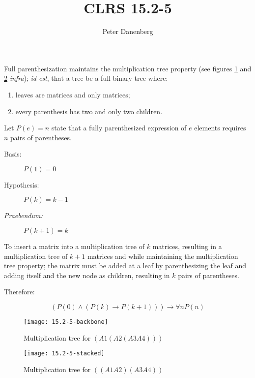 \documentclass{article}
\title{CLRS 15.2-5}
\author{Peter Danenberg}
\begin{document}
\maketitle

Full parenthesization maintains the multiplication tree property (see
figures \ref{fig:backbone} and \ref{fig:stacked} \emph{infra});
\emph{id est}, that a tree be a full binary tree where:

\begin{enumerate}
\item leaves are matrices and only matrices;
\item every parenthesis has two and only two children.
\end{enumerate}

Let $P(e) = n$ state that a fully parenthesized expression of $e$
elements requires $n$ pairs of parentheses.

\begin{description}
  \item[Basis:] $P(1) = 0$
  \item[Hypothesis:] $P(k) = k-1$
  \item[\emph{Praebendum:}] $P(k + 1) = k$
\end{description}

To insert a matrix into a multiplication tree of $k$ matrices,
resulting in a multiplication tree of $k+1$ matrices and while
maintaining the multiplication tree property; the matrix must be added
at a leaf by parenthesizing the leaf and adding itself and the new
node as children, resulting in $k$ pairs of parentheses.

Therefore:

\[(P(0) \wedge (P(k) \to P(k+1))) \to \forall nP(n)\]

\begin{figure}[ht]
  \centering
  \texttt{[image: 15.2-5-backbone]}
  \caption{Multiplication tree for $(A1 (A2 (A3 A4)))$}
  \label{fig:backbone}
\end{figure}

\begin{figure}[ht]
  \centering
  \texttt{[image: 15.2-5-stacked]}
  \caption{Multiplication tree for $((A1 A2)(A3 A4))$}
  \label{fig:stacked}
\end{figure}
\end{document}
